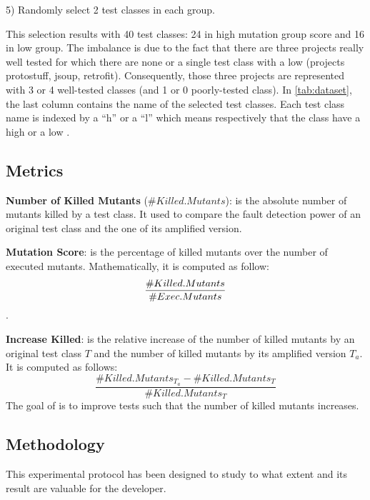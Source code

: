 5) Randomly select 2 test classes in each group.

This selection results with 40 test classes: 24 in high mutation group score and 16 in low \ms group.
The imbalance is due to the fact that there are three projects really well tested for which there are none or a single test class with a low \ms (projects protostuff, jsoup, retrofit).
Consequently, those three projects are represented with 3 or 4 well-tested classes (and 1 or 0 poorly-tested class). 
In \autoref{tab:dataset}, the last column contains the name of the selected test classes. 
Each test class name is indexed by a ``h'' or a ``l'' which means respectively that the class have a high \ms or a low \ms.

\subsection{Metrics}
\label{subsec:test-improvement:experiment-protocol:metrics}

\textbf{Number of Killed Mutants} ($\#Killed.Mutants$): is the absolute number of mutants killed by a test class. 
It used to compare the fault detection power of an original test class and the one of its amplified version.

\textbf{Mutation Score}: is the percentage of killed mutants over the number of executed mutants.
 Mathematically, it is computed as follow: $$\frac{\#Killed.Mutants}{\#Exec.Mutants} \time 100$$.

\textbf{Increase Killed}: is the relative increase of the number of killed mutants by an original test class $T$ and the number of killed mutants by its amplified version $T_a$.
It is computed as follows:
$$\frac{\#Killed.Mutants_{T_a} - \#Killed.Mutants_T}{\#Killed.Mutants_T}$$
The goal of \dspot is to improve tests such that the number of killed mutants increases.

\subsection{Methodology}
\label{subsec:test-improvement:experiment-protocol:methodology}

This experimental protocol has been designed to study to what extent \dspot and its result are valuable for the developer.

